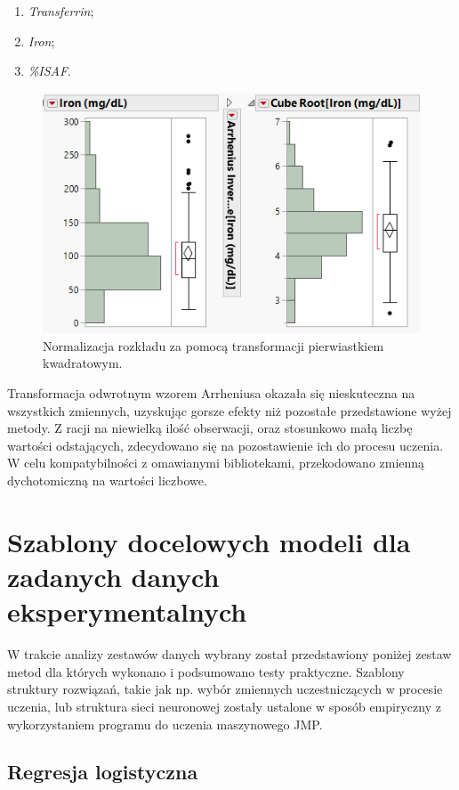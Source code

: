 	\begin{enumerate}
		\item \textit{Transferrin};
		\item \textit{Iron};
		\item \textit{\%ISAF}.
	\end{enumerate}

	\begin{figure}
		\centering
		\includegraphics[width=0.7\linewidth]{Rozdzial3/cube2}
		\caption{Normalizacja rozkładu za pomocą transformacji pierwiastkiem kwadratowym.}
		\label{fig:cube2}
	\end{figure}

	Transformacja odwrotnym wzorem Arrheniusa okazała się nieskuteczna na wszystkich zmiennych, uzyskując gorsze efekty niż pozostałe przedstawione wyżej metody. Z racji na niewielką ilość obserwacji, oraz stosunkowo małą liczbę wartości odstających, zdecydowano się na pozostawienie ich do procesu uczenia. W celu kompatybilności z omawianymi bibliotekami, przekodowano zmienną dychotomiczną na wartości liczbowe.

\section{Szablony docelowych modeli dla zadanych danych eksperymentalnych}

W trakcie analizy zestawów danych wybrany został przedstawiony poniżej zestaw metod dla których wykonano i podsumowano testy praktyczne. Szablony struktury rozwiązań, takie jak np. wybór zmiennych uczestniczących w procesie uczenia, lub struktura sieci neuronowej zostały ustalone w sposób empiryczny z wykorzystaniem programu do uczenia maszynowego JMP. 

\subsection{Regresja logistyczna}

